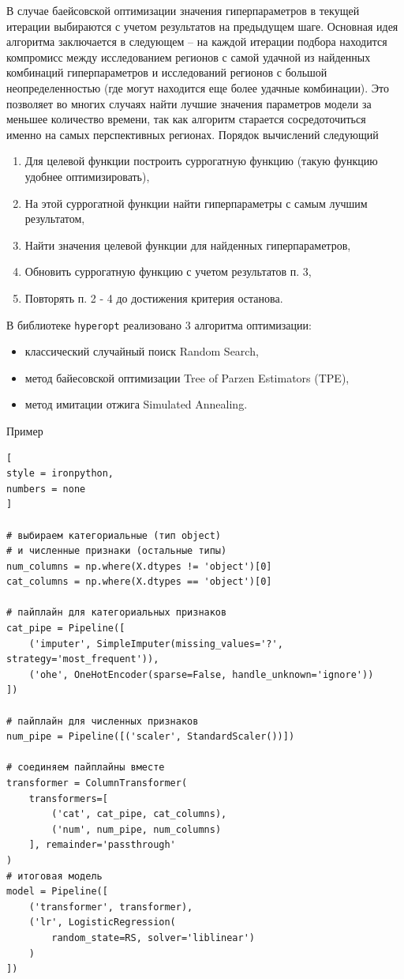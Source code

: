 \documentclass[%
	11pt,
	a4paper,
	utf8,
		]{article}
\begin{document}
В случае баейсовской оптимизации значения гиперпараметров в текущей итерации выбираются с учетом результатов на предыдущем шаге. Основная идея алгоритма заключается в следующем -- на каждой итерации подбора находится компромисс между исследованием регионов с самой удачной из найденных комбинаций гиперпараметров и исследований регионов с большой неопределенностью (где могут находится еще более удачные комбинации). Это позволяет во многих случаях найти лучшие значения параметров модели за меньшее количество времени, так как алгоритм старается сосредоточиться именно на самых перспективных регионах. Порядок вычислений следующий
\begin{enumerate}
	\item Для целевой функции построить суррогатную функцию (такую функцию удобнее оптимизировать),
	
	\item На этой суррогатной функции найти гиперпараметры с самым лучшим результатом,
	
	\item Найти значения целевой функции для найденных гиперпараметров,
	
	\item Обновить суррогатную функцию с учетом результатов п. 3,
	
	\item Повторять п. 2 - 4 до достижения критерия останова.
\end{enumerate}

В библиотеке \texttt{hyperopt} реализовано 3 алгоритма оптимизации:
\begin{itemize}
	\item классический случайный поиск Random Search,
	
	\item метод байесовской оптимизации Tree of Parzen Estimators (TPE),
	
	\item метод имитации отжига Simulated Annealing.
\end{itemize}

Пример
\begin{lstlisting}[
style = ironpython,
numbers = none	
]

# выбираем категориальные (тип object)
# и численные признаки (остальные типы)
num_columns = np.where(X.dtypes != 'object')[0]
cat_columns = np.where(X.dtypes == 'object')[0]

# пайплайн для категориальных признаков
cat_pipe = Pipeline([
	('imputer', SimpleImputer(missing_values='?', strategy='most_frequent')),
	('ohe', OneHotEncoder(sparse=False, handle_unknown='ignore'))
])

# пайплайн для численных признаков
num_pipe = Pipeline([('scaler', StandardScaler())])

# соединяем пайплайны вместе
transformer = ColumnTransformer(
	transformers=[
		('cat', cat_pipe, cat_columns),
		('num', num_pipe, num_columns)
	], remainder='passthrough'
) 
# итоговая модель
model = Pipeline([
	('transformer', transformer),
	('lr', LogisticRegression(
		random_state=RS, solver='liblinear')
	)
])
\end{lstlisting}
\end{document}

